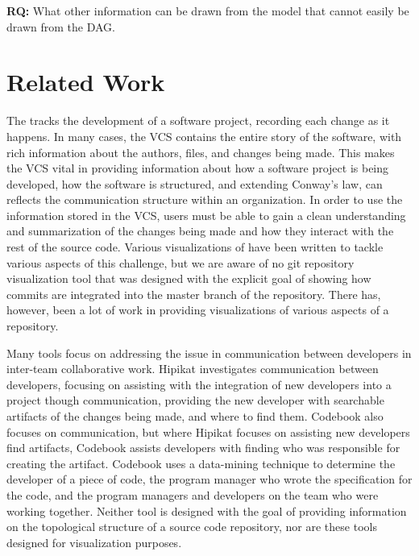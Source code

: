 \begin{textbox}
  \textbf{RQ:} What other information can be drawn from the
  \mt{} model that cannot easily be drawn from the DAG.
\end{textbox}


\section{Related Work}\label{sec:related_work}

The  tracks the development of a
software project, recording each change as it happens. In many cases,
the VCS contains the entire story of the software, with rich information
about the authors, files, and changes being made. This makes the VCS
vital in providing information about how a software project is being
developed, how the software is structured, and extending Conway's law,
can reflects the communication structure within an organization. In
order to use the information stored in the VCS, users must be able to
gain a clean understanding and summarization of the changes being made
and how they interact with the rest of the source code. Various
visualizations of have been written to tackle various aspects of this
challenge, but we are aware of no git repository visualization tool that
was designed with the explicit goal of showing how commits are
integrated into the master branch of the repository. There has, however,
been a lot of work in providing visualizations of various aspects of a
repository.

Many tools focus on addressing the issue in communication between
developers in inter-team collaborative work. Hipikat\cite{Cubranic2005}
investigates communication between developers, focusing on assisting
with the integration of new developers into a project though
communication, providing the new developer with searchable artifacts of
the changes being made, and where to find them. Codebook\cite{Begel2010}
also focuses on communication, but where Hipikat focuses on assisting
new developers find artifacts, Codebook assists developers with finding
who was responsible for creating the artifact. Codebook uses a
data-mining technique to determine the developer of a piece of code, the
program manager who wrote the specification for the code, and the
program managers and developers on the team who were working together.
Neither tool is designed with the goal of providing information on the
topological structure of a source code repository, nor are these tools
designed for visualization purposes.

